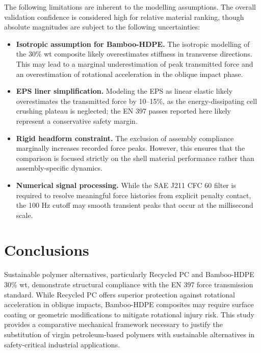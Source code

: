 The following limitations are inherent to the modelling assumptions. The 
overall validation confidence is considered high for relative material 
ranking, though absolute magnitudes are subject to the following 
uncertainties:
\begin{itemize}
    \item \textbf{Isotropic assumption for Bamboo-HDPE.} The 
    isotropic modelling of the 30\% wt composite likely overestimates 
    stiffness in transverse directions. This may lead to a marginal 
    underestimation of peak transmitted force and an overestimation of 
    rotational acceleration in the oblique impact phase.
    \item \textbf{EPS liner simplification.} Modeling the EPS as linear 
    elastic likely overestimates the transmitted force by 10--15\%, as the 
    energy-dissipating cell crushing plateau is neglected; the 
    EN 397 passes reported here likely represent a conservative safety 
    margin.
    \item \textbf{Rigid headform constraint.} The exclusion of assembly 
    compliance marginally increases recorded force peaks. However, this 
    ensures that the comparison is focused strictly on the shell material 
    performance rather than assembly-specific dynamics.
    \item \textbf{Numerical signal processing.} While the SAE J211 CFC 60 
    filter is required to resolve meaningful force histories from explicit 
    penalty contact, the 100 Hz cutoff may smooth transient peaks that occur 
    at the millisecond scale. 
\end{itemize}

\section{Conclusions}
Sustainable polymer alternatives, particularly Recycled PC and 
Bamboo-HDPE 30\% wt, demonstrate structural compliance with the EN 397 
force transmission standard. While Recycled PC offers superior 
protection against rotational acceleration in oblique impacts, 
Bamboo-HDPE composites may require surface coating or geometric 
modifications to mitigate rotational injury risk. This study provides 
a comparative mechanical framework necessary to justify the 
substitution of virgin petroleum-based polymers with sustainable 
alternatives in safety-critical industrial applications.

